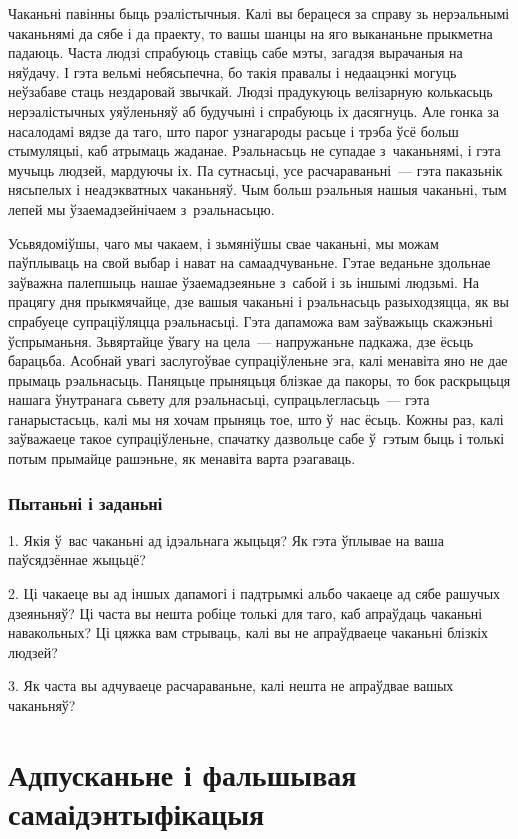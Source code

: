 Чаканьні павінны быць рэалістычныя. Калі вы берацеся за справу зь нерэальнымі чаканьнямі да сябе і да праекту, то вашы шанцы на яго выкананьне прыкметна падаюць. Часта людзі спрабуюць ставіць сабе мэты, загадзя вырачаныя на няўдачу. І гэта вельмі небясьпечна, бо такія правалы і недаацэнкі могуць неўзабаве стаць нездаровай звычкай. Людзі прадукуюць велізарную колькасьць нерэалістычных уяўленьняў аб будучыні і спрабуюць іх дасягнуць. Але гонка за насалодамі вядзе да таго, што парог узнагароды расьце і трэба ўсё больш стымуляцыі, каб атрымаць жаданае. Рэальнасьць не супадае з~чаканьнямі, і гэта мучыць людзей, мардуючы іх. Па сутнасьці, усе расчараваньні~--- гэта паказьнік нясьпелых і неадэкватных чаканьняў. Чым больш рэальныя нашыя чаканьні, тым лепей мы ўзаемадзейнічаем з~рэальнасьцю.

Усьвядоміўшы, чаго мы чакаем, і зьмяніўшы свае чаканьні, мы можам паўплываць на свой выбар і нават на самаадчуваньне. Гэтае веданьне здольнае заўважна палепшыць нашае ўзаемадзеяньне з~сабой і зь іншымі людзьмі. На працягу дня прыкмячайце, дзе вашыя чаканьні і рэальнасьць разыходзяцца, як вы спрабуеце супраціўляцца рэальнасьці. Гэта дапаможа вам заўважыць скажэньні ўспрыманьня. Зьвяртайце ўвагу на цела~--- напружаньне падкажа, дзе ёсьць барацьба. Асобнай увагі заслугоўвае супраціўленьне эга, калі менавіта яно не дае прымаць рэальнасьць. Паняцьце прыняцьця блізкае да пакоры, то бок раскрыцьця нашага ўнутранага сьвету для рэальнасьці, супрацьлегласьць~--- гэта ганарыстасьць, калі мы ня хочам прыняць тое, што ў~нас ёсьць. Кожны раз, калі заўважаеце такое супраціўленьне, спачатку дазвольце сабе ў~гэтым быць і толькі потым прымайце рашэньне, як менавіта варта рэагаваць.

\subsubsection{Пытаньні і заданьні}

1. Якія ў~вас чаканьні ад ідэальнага жыцьця? Як гэта ўплывае на ваша паўсядзённае жыцьцё?

2. Ці чакаеце вы ад іншых дапамогі і падтрымкі альбо чакаеце ад сябе рашучых дзеяньняў? Ці часта вы нешта робіце толькі для таго, каб апраўдаць чаканьні навакольных? Ці цяжка вам стрываць, калі вы не апраўдваеце чаканьні блізкіх людзей?

3. Як часта вы адчуваеце расчараваньне, калі нешта не апраўдвае вашых чаканьняў?


\section{Адпусканьне і фальшывая самаідэнтыфікацыя}

